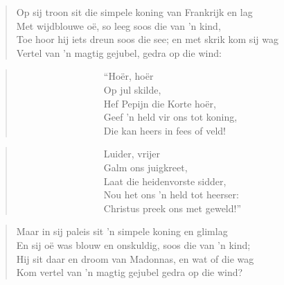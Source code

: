 \begin{verse}
Op sij troon sit die simpele koning van Frankrijk en lag \\ 
Met wijdblouwe o\"e, so leeg soos die van ’n kind, \\ 
Toe hoor hij iets dreun soos die see; en met skrik kom sij wag \\ 
Vertel van ’n magtig gejubel, gedra op die wind: \\ 
\end{verse}

\begin{verse}
\ \ \ \ \ \ \ \ \ \ \ \ \ \ \ \ \ \ ``Ho\"er, ho\"er \\ 
\ \ \ \ \ \ \ \ \ \ \ \ \ \ \ \ \ \ Op jul skilde, \\ 
\ \ \ \ \ \ \ \ \ \ \ \ \ \ \ \ \ \ Hef Pepijn die Korte ho\"er, \\ 
\ \ \ \ \ \ \ \ \ \ \ \ \ \ \ \ \ \ Geef ’n held vir ons tot koning, \\ 
\ \ \ \ \ \ \ \ \ \ \ \ \ \ \ \ \ \ Die kan heers in fees of veld!  \\ 
\end{verse}

\begin{verse}
\ \ \ \ \ \ \ \ \ \ \ \ \ \ \ \ \ \ Luider, vrijer \\ 
\ \ \ \ \ \ \ \ \ \ \ \ \ \ \ \ \ \ Galm ons juigkreet, \\ 
\ \ \ \ \ \ \ \ \ \ \ \ \ \ \ \ \ \ Laat die heidenvorste sidder, \\ 
\ \ \ \ \ \ \ \ \ \ \ \ \ \ \ \ \ \ Nou het ons ’n held tot heerser: \\ 
\ \ \ \ \ \ \ \ \ \ \ \ \ \ \ \ \ \ Christus preek ons met geweld!'' \\ 
\end{verse}

\begin{verse}
Maar in sij paleis sit ’n simpele koning en glimlag \\ 
En sij o\"e was blouw en onskuldig, soos die van ’n kind; \\ 
Hij sit daar en droom van Madonnas, en wat of die wag \\ 
Kom vertel van ’n magtig gejubel gedra op die wind? \\ 
\end{verse}